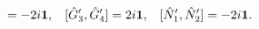 \begin{equation}
[\hat{G}_{1}^{\prime},\hat{G}_{2}^{\prime}]=-2i{\bf 1}, \hspace{0.3cm}
[\hat{G}_{3}^{\prime},\hat{G}_{4}^{\prime}]=2i{\bf 1},\hspace{0.3cm}
[\hat{N}_{1}^{\prime},\hat{N}_{2}^{\prime}]=-2i{\bf 1}.
\label{6dimplane2}
\end{equation}

